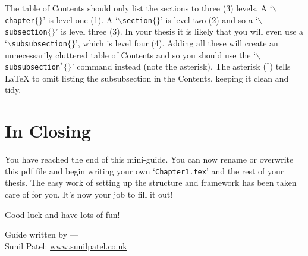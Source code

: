 The table of Contents should only list the sections to three (3) levels. A `$\backslash$\texttt{chapter}$\{\}$' is level one (1). A `$\backslash$\texttt{section}$\{\}$' is level two (2) and so a `$\backslash$\texttt{subsection}$\{\}$' is level three (3). In your thesis it is likely that you will even use a `$\backslash$\texttt{subsubsection}$\{\}$', which is level four (4). Adding all these will create an unnecessarily cluttered table of Contents and so you should use the `$\backslash$\texttt{subsubsection$^{*}\{\}$}' command instead (note the asterisk). The asterisk ($^{*}$) tells \LaTeX{} to omit listing the subsubsection in the Contents, keeping it clean and tidy.


\section{In Closing}

You have reached the end of this mini-guide. You can now rename or overwrite this pdf file and begin writing your own `\texttt{Chapter1.tex}' and the rest of your thesis. The easy work of setting up the structure and framework has been taken care of for you. It's now your job to fill it out!

Good luck and have lots of fun!

\begin{flushright}
Guide written by ---\\
Sunil Patel: \href{http://www.sunilpatel.co.uk}{www.sunilpatel.co.uk}
\end{flushright}
